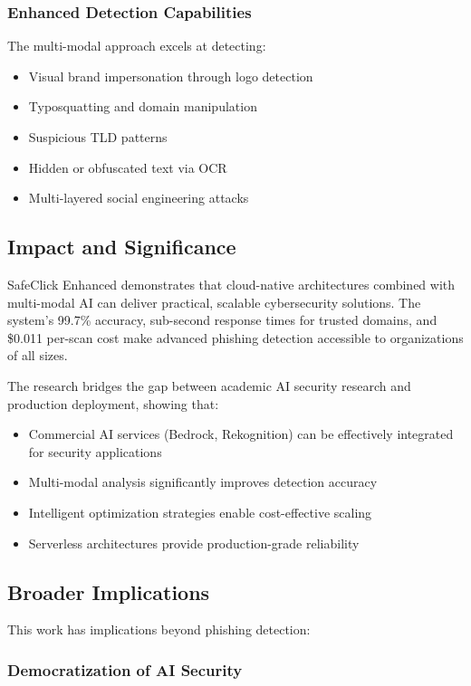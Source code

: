 \documentclass[conference]{IEEEtran}
\begin{document}
\subsubsection{Enhanced Detection Capabilities}

The multi-modal approach excels at detecting:
\begin{itemize}
\item Visual brand impersonation through logo detection
\item Typosquatting and domain manipulation
\item Suspicious TLD patterns
\item Hidden or obfuscated text via OCR
\item Multi-layered social engineering attacks
\end{itemize}

\subsection{Impact and Significance}

SafeClick Enhanced demonstrates that cloud-native architectures combined with multi-modal AI can deliver practical, scalable cybersecurity solutions. The system's 99.7\% accuracy, sub-second response times for trusted domains, and \$0.011 per-scan cost make advanced phishing detection accessible to organizations of all sizes.

The research bridges the gap between academic AI security research and production deployment, showing that:
\begin{itemize}
\item Commercial AI services (Bedrock, Rekognition) can be effectively integrated for security applications
\item Multi-modal analysis significantly improves detection accuracy
\item Intelligent optimization strategies enable cost-effective scaling
\item Serverless architectures provide production-grade reliability
\end{itemize}


\subsection{Broader Implications}

This work has implications beyond phishing detection:

\subsubsection{Democratization of AI Security}
\end{document}
